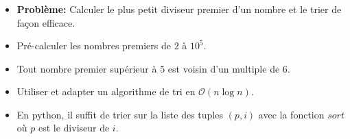 \begin{frame}
    \frametitle{\problemtitle}
    \begin{itemize}
        \item<+-> \textbf{Problème:} Calculer le plus petit diviseur premier d'un nombre et le trier de façon efficace.
        \item<+-> Pré-calculer les nombres premiers de $2$ à $10^5$.
        \item<+-> Tout nombre premier supérieur à $5$ est voisin d'un multiple de $6$.
        \item<+-> Utiliser et adapter un algorithme de tri en $\mathcal{O}(n\log n)$.
        \item<+-> En python, il suffit de trier sur la liste des tuples $(p, i)$ avec la fonction $sort$ où $p$ est le diviseur de $i$.

    \end{itemize}
    \solvestats
\end{frame}
